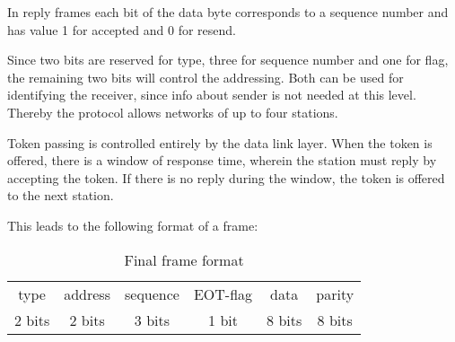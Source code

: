
In reply frames each bit of the data byte corresponds to a
sequence number and has value 1 for accepted and 0 for resend.

Since two bits are reserved for type, three for sequence number and one for flag,
the remaining two bits will control the addressing. Both can be used
for identifying the receiver, since info about sender is not needed at this
level. Thereby the protocol allows networks of up to four stations.

Token passing is controlled entirely by the data link layer. When the token is
offered, there is a window of response time, wherein the station must reply by accepting
the token. If there is no reply during the window, the token is offered to the
next station. 

This leads to the following format of a frame: 

\begin{table}[htb]
 \centering
 \begin{tabular}{|c|c|c|c|c|c|}
  \hline
  type & address & sequence & EOT-flag & data & parity \\
  2 bits & 2 bits & 3 bits & 1 bit & 8 bits & 8 bits\\
  \hline
 \end{tabular}
 \caption{Final frame format}
 \label{tab:final_frame_format}
\end{table}
